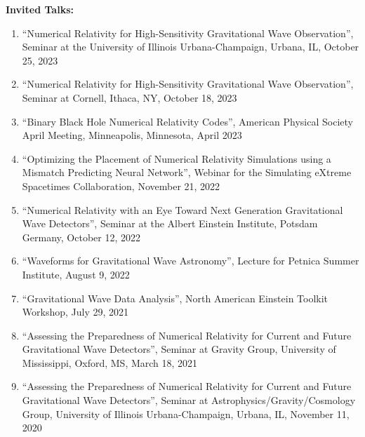 \documentclass[11pt]{article}
\begin{document}
\begin{flushleft}
\textbf{Invited Talks:}
  \begin{enumerate}
  \item ``Numerical Relativity for High-Sensitivity Gravitational Wave Observation'', Seminar at the University of Illinois Urbana-Champaign, Urbana, IL, October 25, 2023
  \item ``Numerical Relativity for High-Sensitivity Gravitational Wave Observation'', Seminar at Cornell, Ithaca, NY, October 18, 2023
  \item ``Binary Black Hole Numerical Relativity Codes'', American Physical Society April Meeting, Minneapolis, Minnesota, April 2023
  \item ``Optimizing the Placement of Numerical Relativity Simulations using a Mismatch Predicting Neural Network'',  Webinar for the Simulating eXtreme Spacetimes Collaboration,  November 21, 2022
  \item ``Numerical Relativity with an Eye Toward Next Generation Gravitational Wave Detectors'', Seminar at the Albert Einstein Institute, Potsdam Germany, October 12, 2022 
  \item ``Waveforms for Gravitational Wave Astronomy'', Lecture for Petnica Summer Institute, August 9, 2022
  \item ``Gravitational Wave Data Analysis'', North American Einstein Toolkit Workshop, July 29, 2021
  \item ``Assessing the Preparedness of Numerical Relativity for Current and Future Gravitational Wave Detectors'', Seminar at Gravity Group, University of Mississippi, Oxford, MS, March 18, 2021
  \item ``Assessing the Preparedness of Numerical Relativity for Current and Future Gravitational Wave Detectors'', Seminar at Astrophysics/Gravity/Cosmology Group, University of Illinois Urbana-Champaign, Urbana, IL, November 11, 2020
  \end{enumerate}


\end{flushleft}
\end{document}
